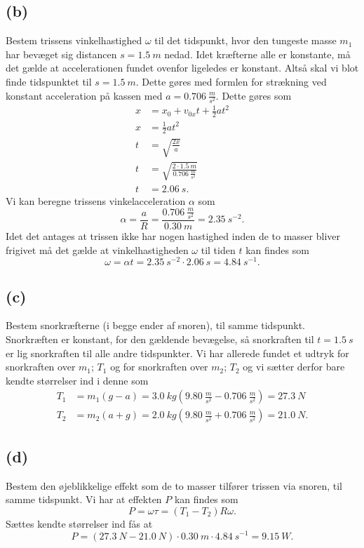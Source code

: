 \documentclass[12pt]{article}
\theoremstyle{definition}
\begin{document}
\subsection*{(b)}
Bestem trissens vinkelhastighed $\omega$ til det tidspunkt, hvor den tungeste masse $m_1$ har bevæget sig distancen $s = \qty{1,5}{m}$ nedad.
\bigbreak
Idet kræfterne alle er konstante, må det gælde at accelerationen fundet ovenfor ligeledes er konstant. Altså skal vi blot finde tidspunktet til $s = \qty{1,5}{m}$. Dette gøres med formlen for strækning ved konstant acceleration på kassen med $a = \qty{0,706}{\frac{m}{s^2}}$. Dette gøres som
\begin{align*}
  x &= x_0 + v_{0x}t + \frac{1}{2}at^2 \\
  x &= \frac{1}{2}at^2 \\
  t &= \sqrt{\frac{2x}{a}} \\
  t &= \sqrt{\frac{2 \cdot \qty{1,5}{m} }{\qty{0,706}{\frac{m}{s^2}}}} \\
  t &= \qty{2,06}{s}
.\end{align*}
Vi kan beregne trissens vinkelacceleration $\alpha$ som
\[ 
\alpha = \frac{a}{R} = \frac{\qty{0,706}{\frac{m}{s^2}}}{\qty{0,30}{m}} = \qty{2,35}{s^{-2}} 
.\]
Idet det antages at trissen ikke har nogen hastighed inden de to masser bliver frigivet må det gælde at vinkelhastigheden $\omega$ til tiden $t$ kan findes som
\[ 
  \omega = \alpha t = \qty{2,35}{s^{-2}} \cdot \qty{2,06}{s}  = \qty{4,84}{s^{-1}} 
.\]


\subsection*{(c)}
Bestem snorkræfterne (i begge ender af snoren), til samme tidspunkt.
\bigbreak
Snorkræften er konstant, for den gældende bevægelse, så snorkraften til $t = \qty{1,5}{s}$ er lig snorkraften til alle andre tidspunkter. Vi har allerede fundet et udtryk for snorkraften over $m_1$; $T_1$ og for snorkraften over $m_2$; $T_2$ og vi sætter derfor bare kendte størrelser ind i denne som
\begin{align*}
  T_1 &= m_1 (g - a) = \qty{3,0}{kg} \left( \qty{9,80}{\frac{m}{s^2}} - \qty{0,706}{\frac{m}{s^2}}  \right) = \qty{27,3}{N} \\ 
  T_2 &= m_2 (a + g) = \qty{2,0}{kg} \left( \qty{9,80}{\frac{m}{s^2}} + \qty{0,706}{\frac{m}{s^2}}  \right) = \qty{21,0}{N} 
.\end{align*}


\subsection*{(d)}
Bestem den øjeblikkelige effekt som de to masser tilfører trissen via snoren, til samme tidspunkt.
\bigbreak
Vi har at effekten $P$ kan findes som
\[ 
P = \omega \tau = (T_1 - T_2)R\omega
.\]
Sættes kendte størrelser ind fås at
\[ 
P = \left( \qty{27,3}{N}  - \qty{21,0}{N}  \right) \cdot \qty{0,30}{m} \cdot \qty{4,84}{s^{-1}} = \qty{9,15}{W} 
.\]
\end{document}
